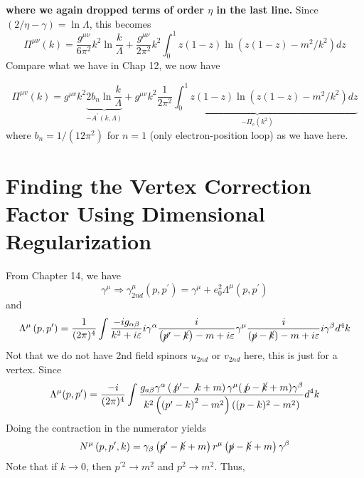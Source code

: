 \textbf{where we again dropped terms of order $\eta$ in the last line.} Since $(2/\eta-\gamma)=\ln\Lambda$, this becomes
\begin{equation}
\Pi^{\mu\nu}(k)=\frac{g^{\mu \nu}}{6 \pi^{2}} k^{2} \ln \frac{k}{\Lambda}+\frac{g^{\mu \nu}}{2 \pi^{2}} k^{2} \int_{0}^{1} z(1-z) \ln \left(z(1-z)-m^{2} / k^{2}\right) d z\end{equation}
Compare what we have in Chap 12, we now have
\begin{qt}
    \begin{equation}
    \Pi^{\mu v}(k)=g^{\mu v} k^{2} \underbrace{2 b_{n} \ln \frac{k}{\Lambda}}_{-A^{\prime}(k, \Lambda)}+g^{\mu v} k^{2} \underbrace{\frac{1}{2 \pi^{2}} \int_{0}^{1} z(1-z) \ln \left(z(1-z)-m^{2} / k^{2}\right)dz}_{-\Pi_c(k^2)}
    \end{equation}
    where $b_n=1/(12\pi^2)$ for $n=1$ (only electron-position loop) as we have here.
\end{qt}
\section{Finding the Vertex Correction Factor Using Dimensional Regularization}
From Chapter 14, we have
\begin{equation}\gamma^{\mu} \Rightarrow \gamma_{2 n d}^{\mu}\left(p, p^{\prime}\right)=\gamma^{\mu}+e_{0}^{2} \Lambda^{\mu}\left(p, p^{\prime}\right)\end{equation}
and
\begin{equation}\Lambda^{\mu}\left(p, p^{\prime}\right)=\frac{1}{(2 \pi)^{4}} \int \frac{-i g_{\alpha \beta}}{k^{2}+i \varepsilon} i \gamma^{\alpha} \frac{i}{\left(\cancel{p}^{\prime}-\cancel{k}\right)-m+i \varepsilon} \gamma^{\mu} \frac{i}{(\cancel{p}-\cancel{k})-m+i \varepsilon} i \gamma^{\beta} d^{4} k
\end{equation}
Not that we do not have 2nd field spinors $u_{2nd}$ or $v_{2nd}$ here, this is just for a vertex. Since
\begin{equation}
    \Lambda^{\mu}(p,p^{\prime})=\frac{-i}{(2 \pi)^{4}} \int \frac{g_{a \beta} \gamma^{\alpha}\left(\not p^{\prime}-\not k+m\right) \gamma^{\mu}(\not p-\cancel{k}+m) \gamma^{\beta}}{k^{2}\left(\left(p^{\prime}-k\right)^{2}-m^{2}\right)\left((p-k)^{2}-m^{2}\right)} d^{4} k
    \label{explicit-lambda}
\end{equation}
Doing the contraction in the numerator yields
\begin{equation}N^{\mu}\left(p, p^{\prime}, k\right)=\gamma_{\beta}\left(\cancel{p}^{\prime}-\cancel{k}+m\right) r^{\mu}\left(\cancel{p}-\cancel{k}+m\right) \gamma^{\beta}\end{equation}
Note that if $k\rightarrow0$, then $p^{\prime 2} \rightarrow m^{2}$ and $p^{2} \rightarrow m^2$. Thus, 

